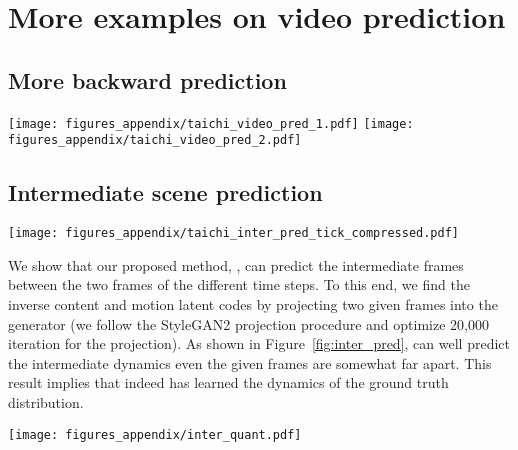 \documentclass{article} \usepackage{iclr2022_conference,times}
\makeatletter
\DeclareRobustCommand\onedot{\futurelet\@let@token\@onedot}
\def\@onedot{\ifx\@let@token.\else.\null\fi\xspace}
\def\ie{\emph{i.e}\onedot} \def\Ie{\emph{I.e}\onedot}
\makeatother
\begin{document}
 
\clearpage
\section{More examples on video prediction}
\label{appen:more_pred}


\subsection{More backward prediction}
\label{appen:back_pred}


\begin{figure*}[h]
\centering
\texttt{[image: figures\_appendix/taichi\_video\_pred\_1.pdf]}
\texttt{[image: figures\_appendix/taichi\_video\_pred\_2.pdf]}
\caption{
More examples on forward and backward prediction results of \sname. Yellow box indicates the given frame.
}\label{fig:more_video_pred}
\end{figure*}



\subsection{Intermediate scene prediction}
\label{appen:inter_pred}

\begin{figure*}[h]
\centering
\texttt{[image: figures\_appendix/taichi\_inter\_pred\_tick\_compressed.pdf]}
\caption{
Intermediate scene (\ie, frame) prediction results of our method, \sname. The yellow boxes indicate the given initial and last frames.
}\label{fig:inter_pred}
\end{figure*}

We show that our proposed method, \sname, can predict the intermediate frames between the two frames of the different time steps. To this end, we find the inverse content and motion latent codes by projecting two given frames into the generator (we follow the StyleGAN2 projection procedure \citep{karras2020analyzing} and optimize 20,000 iteration for the projection). As shown in Figure~\ref{fig:inter_pred}, \sname can well predict the intermediate dynamics even the given frames are somewhat far apart. This result implies that \sname indeed has learned the dynamics of the ground truth distribution. 

\newpage
\begin{figure*}[h]
\centering
\texttt{[image: figures\_appendix/inter\_quant.pdf]}
\caption{
Comparison of intermediate scene (\ie, frame) prediction results by StyleGAN2 and our method, \sname. The yellow boxes indicate the given initial and last frames.
}\label{fig:inter_quant}
\end{figure*}
\end{document}
